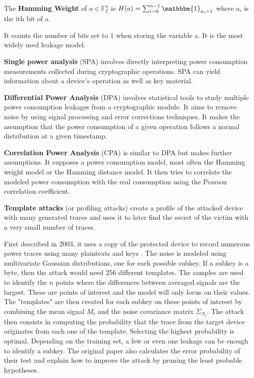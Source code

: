 \documentclass[11pt]{sdm}
\begin{document}
The \textbf{Hamming Weight} of $a \in \mathbb{F}_2^n$ is $H(a) = \sum_{i=0}^{n-1} \mathbbm{1}_{a_i = 1}$ where $a_i$ is the ith bit of a.

It counts the number of bits set to 1 when storing the variable a.
It is the most widely used leakage model.

\textbf{Single power analysis} (SPA) involves directly interpreting power consumption measurements collected during cryptographic operations. %
SPA can yield information about a device's operation as well as key material.

\textbf{Differential Power Analysis} (DPA) involves statistical tools to study multiple power consumption leakages from a cryptographic module.
It aims to remove noise by using signal processing and error corrections techniques.
It makes the assumption that the power consumption of a given operation follows a normal distribution at a given timestamp. 

\textbf{Correlation Power Analysis} (CPA) is similar to DPA but makes further assumptions.
It supposes a power consumption model, most often the Hamming weight model or the Hamming distance model.
It then tries to correlate the modeled power consumption with the real consumption using the Pearson correlation coefficient. %

\textbf{Template attacks} (or profiling attacks) create a profile of the attacked device with many generated traces and uses it to later find the secret of the victim with a very small number of traces.

First described in 2003, it uses a copy of the protected device to record numerous power traces using many plaintexts and keys \parencite{Chari_Rao_Rohatgi_2003}.
The noise is modeled using multivariate Gaussian distributions, one for each possible subkey.
If a subkey is a byte, then the attack would need 256 different templates.
The samples are used to identify the $n$ points where the differences between averaged signals are the largest.
These are points of interest and the model will only focus on their values.
The "templates" are then created for each subkey on these points of interest by combining the mean signal $M_i$ and the noise covariance matrix $\Sigma_{N_i}$.
The attack then consists in computing the probability that the trace from the target device originates from each one of the template.
Selecting the highest probability is optimal.
Depending on the training set, a few or even one leakage can be enough to identify a subkey.
The original paper also calculates the error probability of their test and explain how to improve the attack by pruning the least probable hypotheses.
\end{document}
